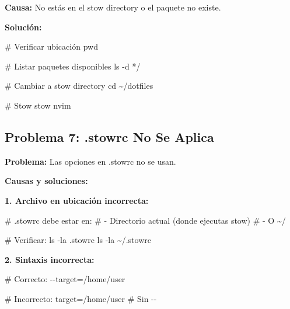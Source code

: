\documentclass[
  doc,
  floatsintext,
  longtable,
  a4paper,
  nolmodern,
  notxfonts,
  notimes,
  12pt,
  colorlinks=true,linkcolor=blue,citecolor=blue,urlcolor=blue]{apa7}
\newenvironment{Shaded}{\begin{snugshade}}{\end{snugshade}}
\newcommand{\AttributeTok}[1]{\textcolor[rgb]{0.40,0.45,0.13}{#1}}
\newcommand{\BuiltInTok}[1]{\textcolor[rgb]{0.00,0.23,0.31}{#1}}
\newcommand{\CommentTok}[1]{\textcolor[rgb]{0.37,0.37,0.37}{#1}}
\newcommand{\ExtensionTok}[1]{\textcolor[rgb]{0.00,0.23,0.31}{#1}}
\newcommand{\FunctionTok}[1]{\textcolor[rgb]{0.28,0.35,0.67}{#1}}
\newcommand{\NormalTok}[1]{\textcolor[rgb]{0.00,0.23,0.31}{#1}}
\newcommand{\OperatorTok}[1]{\textcolor[rgb]{0.37,0.37,0.37}{#1}}
\newcommand{\PreprocessorTok}[1]{\textcolor[rgb]{0.68,0.00,0.00}{#1}}
\newcommand{\VariableTok}[1]{\textcolor[rgb]{0.07,0.07,0.07}{#1}}
\begin{document}
\textbf{Causa:} No estás en el stow directory o el paquete no existe.

\textbf{Solución:}

\begin{Shaded}
\begin{Highlighting}[]
\CommentTok{\# Verificar ubicación}
\BuiltInTok{pwd}

\CommentTok{\# Listar paquetes disponibles}
\FunctionTok{ls} \AttributeTok{{-}d} \PreprocessorTok{*}\NormalTok{/}

\CommentTok{\# Cambiar a stow directory}
\BuiltInTok{cd}\NormalTok{ \textasciitilde{}/dotfiles}

\CommentTok{\# Stow}
\ExtensionTok{stow}\NormalTok{ nvim}
\end{Highlighting}
\end{Shaded}

\subsection{Problema 7: .stowrc No Se
Aplica}\label{problema-7-.stowrc-no-se-aplica}

\textbf{Problema:} Las opciones en .stowrc no se usan.

\textbf{Causas y soluciones:}

\textbf{1. Archivo en ubicación incorrecta:}

\begin{Shaded}
\begin{Highlighting}[]
\CommentTok{\# .stowrc debe estar en:}
\CommentTok{\# {-} Directorio actual (donde ejecutas stow)}
\CommentTok{\# {-} O \textasciitilde{}/}

\CommentTok{\# Verificar:}
\FunctionTok{ls} \AttributeTok{{-}la}\NormalTok{ .stowrc}
\FunctionTok{ls} \AttributeTok{{-}la}\NormalTok{ \textasciitilde{}/.stowrc}
\end{Highlighting}
\end{Shaded}

\textbf{2. Sintaxis incorrecta:}

\begin{Shaded}
\begin{Highlighting}[]
\CommentTok{\# Correcto:}
\ExtensionTok{{-}{-}target=/home/user}

\CommentTok{\# Incorrecto:}
\VariableTok{target}\OperatorTok{=}\NormalTok{/home/user  }\CommentTok{\# Sin {-}{-}}
\end{Highlighting}
\end{Shaded}
\end{document}
